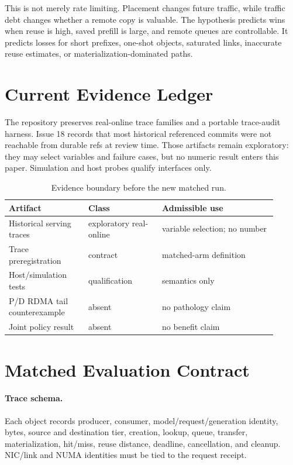 \documentclass[10pt]{article}
\begin{document}
This is not merely rate limiting. Placement changes future traffic, while
traffic debt changes whether a remote copy is valuable. The hypothesis predicts
wins when reuse is high, saved prefill is large, and remote queues are
controllable. It predicts losses for short prefixes, one-shot objects, saturated
links, inaccurate reuse estimates, or materialization-dominated paths.

\section{Current Evidence Ledger}

The repository preserves real-online trace families and a portable trace-audit
harness. Issue 18 records that most historical referenced commits were not
reachable from durable refs at review time. Those artifacts remain exploratory:
they may select variables and failure cases, but no numeric result enters this
paper. Simulation and host probes qualify interfaces only.

\begin{table}[h]
\centering
\caption{Evidence boundary before the new matched run.}
\begin{tabular}{p{0.27\linewidth}p{0.25\linewidth}p{0.39\linewidth}}
\toprule
Artifact & Class & Admissible use \\
\midrule
Historical serving traces & exploratory real-online & variable selection; no number \\
Trace preregistration & contract & matched-arm definition \\
Host/simulation tests & qualification & semantics only \\
P/D RDMA tail counterexample & absent & no pathology claim \\
Joint policy result & absent & no benefit claim \\
\bottomrule
\end{tabular}
\end{table}

\section{Matched Evaluation Contract}

\paragraph{Trace schema.}
Each object records producer, consumer, model/request/generation identity,
bytes, source and destination tier, creation, lookup, queue, transfer,
materialization, hit/miss, reuse distance, deadline, cancellation, and cleanup.
NIC/link and NUMA identities must be tied to the request receipt.
\end{document}

